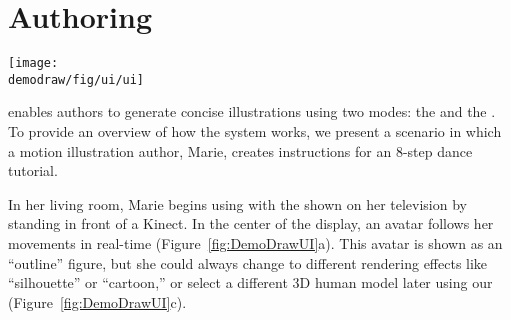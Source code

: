 
\section{Authoring}

\begin{figure*}[t]
  \centering
	\texttt{[image: \\demodraw/fig/ui/ui]}
  \caption{\systemname{} authoring UI: Using the \phaseI{}, an author sees an avatar following her real-time movement (a). During a recording (initiated by voice command ``Record'', real-time feedback shows the speech labels. Once a recording is completed by voice command ``Stop'', the motion visualization and a timeline are immediately available (b) for the author to review, and a step-by-step overview will be generated. Later using the \phaseI{}, the author can refine the visuals and explore more illustration effects (c).}
  \label{fig:DemoDrawUI}
\end{figure*}

\systemname{} enables authors to generate concise illustrations using two modes: the \phaseI{} and the \phaseII{}.
To provide an overview of how the system works, we present a scenario in which a motion illustration author, Marie, creates instructions for an 8-step dance tutorial.

In her living room, Marie begins using \systemname{} with the \phaseI{} shown on her television by standing in front of a Kinect. In the center of the display, an avatar follows her movements in real-time (Figure~\ref{fig:DemoDrawUI}a).
This avatar is shown as an ``outline'' figure, but she could always change to different rendering effects like ``silhouette'' or ``cartoon,'' or select a different 3D human model later using our \phaseII{} (Figure~\ref{fig:DemoDrawUI}c).


